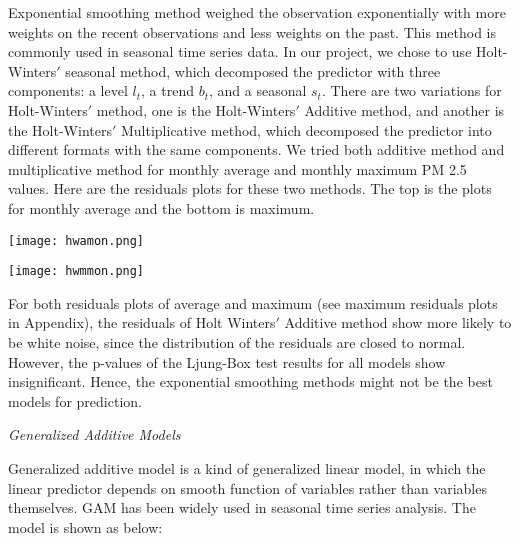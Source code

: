 \documentclass[11pt,]{article}
\begin{document}
Exponential smoothing method weighed the observation exponentially with more weights on the recent observations and less weights on the past. This method is commonly used in seasonal time series data. In our project, we chose to use Holt-Winters$'$ seasonal method, which decomposed the predictor with three components: a level $l_t$, a trend $b_t$, and a seasonal $s_t$. There are two variations for Holt-Winters$'$ method, one is the Holt-Winters$'$ Additive method, and another is the Holt-Winters$'$ Multiplicative method, which decomposed the predictor into different formats with the same components. We tried both additive method and multiplicative method for monthly average and monthly maximum PM 2.5 values. Here are the residuals plots for these two methods. The top is the plots for monthly average and the bottom is maximum.

\vspace{3mm}

\begin{minipage}{.45\linewidth}
\begin{flushleft}

{\texttt{[image: hwamon.png]}}

\end{flushleft} 
\end{minipage}
\hfill
\begin{minipage}{.45\linewidth}
\begin{flushright} 

{\texttt{[image: hwmmon.png]}}


\end{flushright} 
\end{minipage}


\vspace{3mm}

For both residuals plots of average and maximum (see maximum residuals plots in Appendix), the residuals of Holt Winters$'$ Additive method show more likely to be white noise, since the distribution of the residuals are closed to normal. However, the p-values of the Ljung-Box test results for all models show insignificant. Hence, the exponential smoothing methods might not be the best models for prediction.

\vspace{3mm}

\noindent\emph{Generalized Additive Models}

\vspace{3mm}

Generalized additive model is a kind of generalized linear model, in which the linear predictor depends on smooth function of variables rather than variables themselves. GAM has been widely used in seasonal time series analysis. The model is shown as below:
\end{document}
